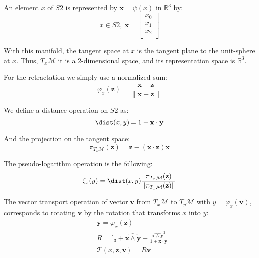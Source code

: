 An element $x$ of $S2$ is represented by $\mathbf{x}=\psi(x)$ in $\mathbb{R}^{3}$ by:
\begin{equation}
  x\in S2,\ \mathbf{x} =\begin{bmatrix}
    x_0\\
    x_1\\
    x_2\\
  \end{bmatrix}
\end{equation}

With this manifold, the tangent space at $x$ is the tangent plane to the unit-sphere at $x$.
Thus, $T_x\mathcal{M}$ it is a 2-dimensional space, and its representation space is $\mathbb{R}^3$.

For the retractation we simply use a normalized sum:
\begin{equation}
  \varphi_x(\mathbf{z}) = \frac{\mathbf{x}+\mathbf{z}}{\|\mathbf{x}+\mathbf{z}\|}
\end{equation}

We define a distance operation on $S2$ as:
\begin{equation}
  \dist(x, y) = 1-\mathbf{x}\cdot \mathbf{y}
\end{equation}

And the projection on the tangent space:
\begin{equation}
  \pi_{T_x\mathcal{M}}(\mathbf{z}) = \mathbf{z} - (\mathbf{x} \cdot \mathbf{z}) \mathbf{x}
\end{equation}

The pseudo-logarithm operation is the following:
\begin{equation}
  \zeta_x(y) = \dist(x,y)\frac{\pi_{T_x\mathcal{M}}(\mathbf{z})}{\|\pi_{T_x\mathcal{M}}(\mathbf{z})\|}
\end{equation}

The vector transport operation of vector $\mathbf{v}$ from $T_x\mathcal{M}$ to $T_y\mathcal{M}$ with $y = \varphi_x(\mathbf{v})$, corresponds to rotating $\mathbf{v}$ by the rotation that transforms $x$ into $y$:
\begin{align}
  &\mathbf{y} = \varphi_x(\mathbf{z}) \\
  &R = \mathbb{I}_3 + \widehat{\mathbf{x} \wedge \mathbf{y}} + \frac{{\widehat{\mathbf{x} \wedge \mathbf{y} } }^2}{1+\mathbf{x}\cdot\mathbf{y}} \\
  &\mathcal{T}(x,\mathbf{z}, \mathbf{v}) = R\mathbf{v}
\end{align}

